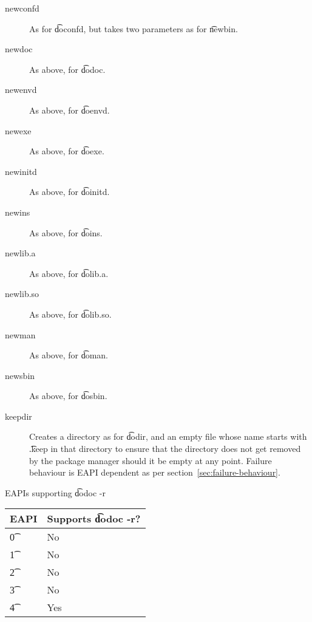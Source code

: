 \begin{description}
\item[newconfd] As for \t{doconfd}, but takes two parameters as for \t{newbin}.

\item[newdoc] As above, for \t{dodoc}.

\item[newenvd] As above, for \t{doenvd}.

\item[newexe] As above, for \t{doexe}.

\item[newinitd] As above, for \t{doinitd}.

\item[newins] As above, for \t{doins}.

\item[newlib.a] As above, for \t{dolib.a}.

\item[newlib.so] As above, for \t{dolib.so}.

\item[newman] As above, for \t{doman}.

\item[newsbin] As above, for \t{dosbin}.

\item[keepdir] Creates a directory as for \t{dodir}, and an empty file whose name starts with
    \t{.keep} in that directory to ensure that the directory does not get removed by the
    package manager should it be empty at any point. Failure behaviour is EAPI dependent as per
    section~\ref{sec:failure-behaviour}.

\end{description}

\begin{centertable}{EAPIs supporting \t{dodoc -r}} \label{tab:dodoc-table}
    \begin{tabular}{ l l }
        \toprule
            \multicolumn{1}{c}{\textbf{EAPI}} &
            \multicolumn{1}{c}{\textbf{Supports \t{dodoc -r}?}} \\
            \midrule
    \t{0} & No \\
    \t{1} & No \\
    \t{2} & No \\
    \t{3} & No \\
    \t{4} & Yes \\
    \bottomrule
    \end{tabular}
\end{centertable}

